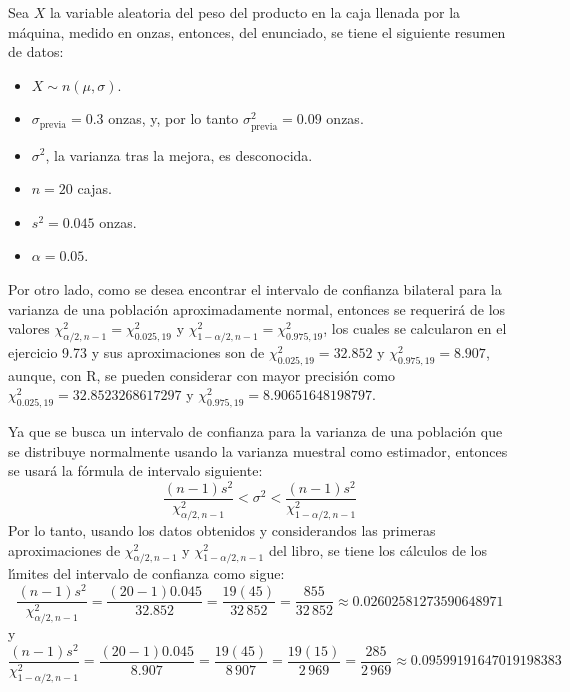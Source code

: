 \begin{solucion}
 Sea $X$ la variable aleatoria del peso del producto en la caja llenada por la m\'aquina, medido en onzas, entonces, del enunciado, se tiene el siguiente resumen de datos:
 \begin{itemize}
  \item $X \sim n(\mu, \sigma)$.
  \item $\sigma_{\text{previa}} = 0.3$ onzas, y, por lo tanto $\sigma^2_{\text{previa}} = 0.09$ onzas.
  \item $\sigma^2$, la varianza tras la mejora, es desconocida.
  \item $n = 20$ cajas.
  \item $s^2 = 0.045$ onzas.
  \item $\alpha = 0.05$.
 \end{itemize}
 Por otro lado, como se desea encontrar el intervalo de confianza bilateral para la varianza de una poblaci\'on aproximadamente normal, entonces se requerir\'a de los valores $\chi^2_{\alpha/2,n-1} = \chi^2_{0.025,19}$ y $\chi^2_{1-\alpha/2,n-1} = \chi^2_{0.975,19}$, los cuales se calcularon en el ejercicio 9.73 y sus aproximaciones son de $\chi^2_{0.025,19} = 32.852$ y $\chi^2_{0.975,19} = 8.907$, aunque, con R, se pueden considerar con mayor precisi\'on como $\chi^2_{0.025,19} = 32.8523268617297$ y $\chi^2_{0.975,19} = 8.90651648198797$.
 \par 
 Ya que se busca un intervalo de confianza para la varianza de una poblaci\'on que se distribuye normalmente usando la varianza muestral como estimador, entonces se usar\'a la f\'ormula de intervalo siguiente:
 \begin{equation*}
  \frac{(n-1)s^2}{\chi^2_{\alpha/2,n-1}} < \sigma^2 < \frac{(n-1)s^2}{\chi^2_{1-\alpha/2,n-1}}
 \end{equation*}
 Por lo tanto, usando los datos obtenidos y considerandos las primeras aproximaciones de $\chi^2_{\alpha/2,n-1}$ y $\chi^2_{1-\alpha/2,n-1}$ del libro, se tiene los c\'alculos de los l\'{\i}mites del intervalo de confianza como sigue:
 \begin{equation*}
  \frac{(n-1)s^2}{\chi^2_{\alpha/2,n-1}} = \frac{(20-1)0.045}{32.852} = \frac{19(45)}{32\,852} = \frac{855}{32\,852} \approx 0.02602581273590648971
 \end{equation*}
 y
 \begin{equation*}
  \frac{(n-1)s^2}{\chi^2_{1-\alpha/2,n-1}} = \frac{(20-1)0.045}{8.907} = \frac{19(45)}{8\,907} = \frac{19(15)}{2\,969} = \frac{285}{2\,969} \approx 0.09599191647019198383

\end{equation*}
\end{solucion}
